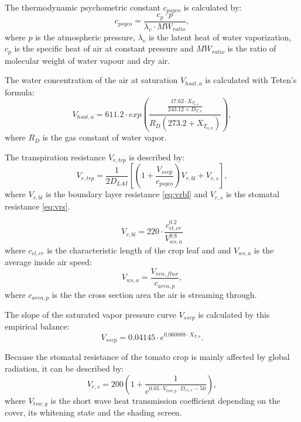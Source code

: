 The thermodynamic psychometric constant $c_{psyco}$ is calculated by:
\begin{equation}\label{eq:psyco}
c_{psyco} = \frac{c_p \cdot p}{\lambda_v \cdot MW_{ratio}},
\end{equation}
where $p$ is the atmospheric pressure, $\lambda_v$ is the latent heat of water vaporization, $c_p$ is the specific heat of air at constant pressure and $MW_{ratio}$ is the ratio of molecular weight of water vapour and dry air.

The water concentration of the air at saturation $V_{hsat,a}$ is calculated with Teten's formula:
\begin{equation}\label{eq:vhsat}
V_{hsat,a} = 611.2 \cdot exp\left({\frac{\frac{17.62 \cdot X_{T_{a,a}}}{243.12 + D_{T,e}}}{R_D \left(273.2 + X_{T_{a,a}}\right)}}\right),
\end{equation} where $R_D$ is the gas constant of water vapor.

The transpiration resistance $V_{r,trp}$ is described by:
\begin{equation}\label{eq:vrtrp}
V_{r,trp} = \frac{1}{2D_{LAI}}\left[\left(1+\frac{V_{ssvp}}{c_{psyco}}\right)V_{r,bl}+V_{r,s}\right],
\end{equation}
where $V_{r,bl}$ is the boundary layer resistance \cref{eq:vrbl} and $V_{r,s}$ is the stomatal resistance \cref{eq:vrs}.

\begin{equation}\label{eq:vrbl}
V_{r,bl} = 220 \cdot \frac{c_{cl,cr}^{0.2}}{V_{ws,a}^{0.8}}
\end{equation}
where $c_{cl,cr}$ is the characteristic length of the crop leaf and and $V_{ws,a}$ is the average inside air speed:
\begin{equation}\label{eq:airspeed}
V_{ws,a} = \frac{V_{ven,flux}}{c_{area,p}},
\end{equation}
where $c_{area,p}$ is the the cross section area the air is streaming through. 

The slope of the saturated vapor pressure curve $V_{ssvp}$ is calculated by this empirical balance:
\begin{equation}\label{eq:ssvp}
V_{ssvp} = 0.04145 \cdot e^{0.060888 \cdot X_{T,a}}.
\end{equation}

Because the stomatal resistance of the tomato crop is mainly affected by global radiation, it can be described by:
\begin{equation}\label{eq:vrs}
V_{r,s}=200\left(1+\frac{1}{e^{0.05 \cdot V_{tsw,g} \cdot D_{rs,e} - 50}}\right),
\end{equation}
where $V_{tsw,g}$ is the short wave heat transmission coefficient depending on the cover, its whitening state and the shading screen.

